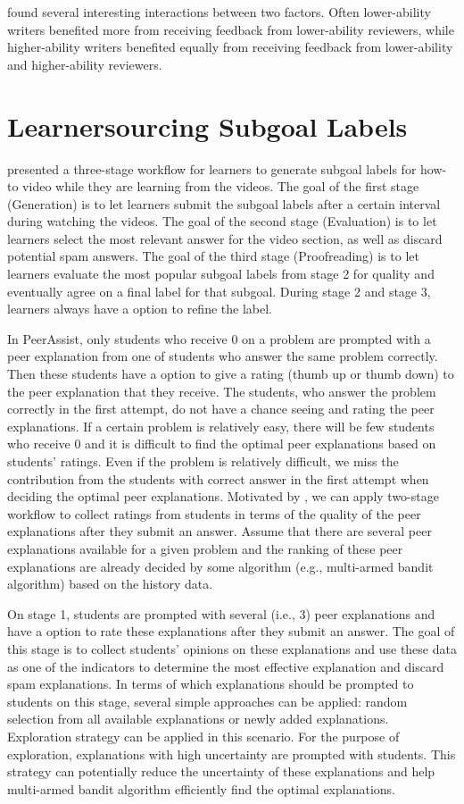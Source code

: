 \documentclass{article}
\begin{document}
\cite{patchan2016understanding} found several interesting interactions
between two factors. Often lower-ability writers benefited more from
receiving feedback from lower-ability reviewers, while higher-ability
writers benefited equally from receiving feedback from lower-ability
and higher-ability reviewers.

\section{Learnersourcing Subgoal Labels}
\cite{Weir2015-hg} presented a three-stage workflow for learners to generate
subgoal labels for how-to video while they are learning from the
videos. The goal of the first stage (Generation) is to let learners submit the
subgoal labels after a certain interval during watching the
videos. The goal of the second stage (Evaluation) is to let learners select the
most relevant answer for the video section, as well as discard
potential spam answers. The goal of the third stage (Proofreading) is
to let learners evaluate the most popular subgoal labels from stage 2
for quality and eventually agree on a final label for that
subgoal. During stage 2 and stage 3, learners always have a option to
refine the label.

In PeerAssist, only students who receive 0 on a problem are
prompted with a peer explanation from one of students who answer the same
problem correctly. Then these students have a option to give a rating
(thumb up or thumb down) to the peer explanation that they
receive. The students, who answer the problem correctly in the first
attempt, do not have a chance seeing and rating the peer
explanations. If
a certain problem is relatively easy, there will be few students who
receive 0 and it is difficult to find the optimal peer explanations
based on students' ratings. Even if the problem is relatively
difficult, we miss the contribution from the students with correct
answer in the first attempt when deciding the optimal peer
explanations. Motivated by \cite{Weir2015-hg}, we can apply two-stage
workflow to collect ratings from students in terms of the quality of
the peer explanations after they submit an answer. Assume that there
are several peer explanations available for a given problem and the
ranking of these peer explanations are already decided by some
algorithm (e.g., multi-armed bandit algorithm) based on the history data.

On stage 1, students are prompted with several (i.e., 3) peer
explanations and have a option to rate these explanations after they
submit an answer. The goal of this stage is to collect students'
opinions on these explanations and use these data as one of the
indicators to determine the most effective explanation and discard
spam explanations. In terms of
which explanations should be prompted to students on this stage,
several simple approaches can be applied: random selection from all
available explanations or newly added explanations. Exploration strategy can be applied in this scenario. For the purpose of
exploration, explanations with high uncertainty are prompted with
students. This strategy can potentially reduce the uncertainty of
these explanations and help multi-armed bandit algorithm efficiently
find the optimal explanations.
\end{document}
